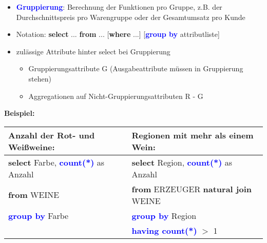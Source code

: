 \documentclass{scrartcl}
\newcommand{\key}[1]{{\textcolor{blue}{\textbf{#1}}}}
\newcommand{\select}{\textbf{select }}
\newcommand{\from}{\textbf{from }}
\newcommand{\where}{\textbf{where }}
\begin{document}
\begin{itemize}
	\itemsep0em
	\item \key{Gruppierung}: Berechnung der Funktionen pro Gruppe, z.B. der Durchschnittspreis pro Warengruppe oder der Gesamtumsatz pro Kunde
	\item Notation: \select ...
		\from ...
		[\where ...]
		[\key{group by} attributliste]
	\item zulässige Attribute hinter select bei Gruppierung
	\begin{itemize}
		\item Gruppierungsattribute G (Ausgabeattribute müssen in Gruppierung stehen)
		\item Aggregationen auf Nicht-Gruppierungsattributen R - G
	\end{itemize}
\end{itemize}

\textbf{Beispiel:} \\
\begin{tabular}{|ll|}
	\hline
	Anzahl der Rot- und Weißweine:  & Regionen mit mehr als einem Wein: \\
	\hline
	\select Farbe, \key{count(*)} as Anzahl & \select Region, \key{count(*)} as Anzahl \\
	\from WEINE & \from ERZEUGER \textbf{natural join} WEINE \\
	\key{group by} Farbe & \key{group by} Region \\
	& \key{having count(*)} $>$ 1\\
	\hline
\end{tabular}
\end{document}
